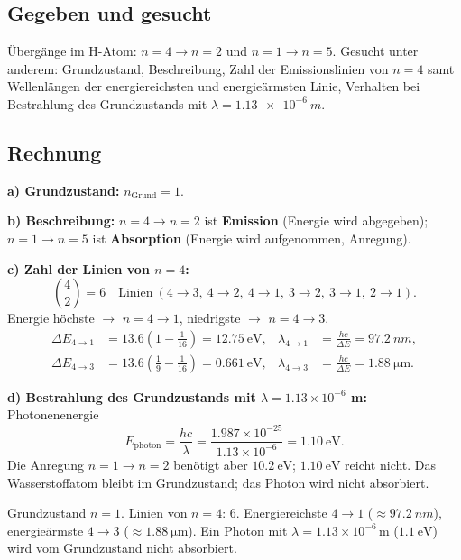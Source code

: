 
\subsection*{Gegeben und gesucht}
Übergänge im H-Atom: $n=4 \rightarrow n=2$ und $n=1 \rightarrow n=5$.
Gesucht unter anderem: Grundzustand, Beschreibung, Zahl der
Emissionslinien von $n=4$ samt Wellenlängen der energiereichsten und
energieärmsten Linie, Verhalten bei Bestrahlung des Grundzustands mit
$\lambda = \qty{1.13e-6}{m}$.

\subsection*{Rechnung}
\textbf{a) Grundzustand:} $n_{\text{Grund}} = 1$.

\textbf{b) Beschreibung:} $n=4 \rightarrow n = 2$ ist \textbf{Emission}
(Energie wird abgegeben); $n=1 \rightarrow n = 5$ ist \textbf{Absorption}
(Energie wird aufgenommen, Anregung).

\textbf{c) Zahl der Linien von $n = 4$:}
\begin{equation*}
  \binom{4}{2} = 6 \quad \text{Linien}
  \ (4{\to}3,\ 4{\to}2,\ 4{\to}1,\ 3{\to}2,\ 3{\to}1,\ 2{\to}1).
\end{equation*}
Energie höchste $\to$ $n=4\rightarrow 1$, niedrigste $\to$ $n=4 \rightarrow 3$.
\begin{align*}
  \Delta E_{4\to1} &= 13.6\!\left(1 - \frac{1}{16}\right) = 12.75\ \mathrm{eV},
  &\lambda_{4\to1} &= \frac{hc}{\Delta E} = \qty{97.2}{nm}, \\[2pt]
  \Delta E_{4\to3} &= 13.6\!\left(\frac{1}{9}-\frac{1}{16}\right)=0.661\ \mathrm{eV},
  &\lambda_{4\to3} &= \frac{hc}{\Delta E} = \qty{1.88}{\micro\meter}.
\end{align*}

\textbf{d) Bestrahlung des Grundzustands mit $\lambda = 1.13\times10^{-6}$ m:}
Photonenenergie
\begin{equation*}
  E_{\text{photon}} = \frac{hc}{\lambda}
  = \frac{1.987\times10^{-25}}{1.13\times10^{-6}}
  = 1.10\ \mathrm{eV}.
\end{equation*}
Die Anregung $n=1\to n=2$ benötigt aber $10.2\ \mathrm{eV}$; $1.10\ \mathrm{eV}$
reicht nicht. Das Wasserstoffatom bleibt im Grundzustand; das Photon wird
nicht absorbiert.

\begin{ergebnis}
Grundzustand $n=1$. Linien von $n=4$: $6$. Energiereichste
$4\to1$ ($\approx \qty{97.2}{nm}$), energieärmste $4\to3$
($\approx \qty{1.88}{\micro\meter}$). Ein Photon mit
$\lambda = 1.13\times10^{-6}\,\mathrm{m}$ ($1.1\ \mathrm{eV}$) wird vom
Grundzustand nicht absorbiert.
\end{ergebnis}

